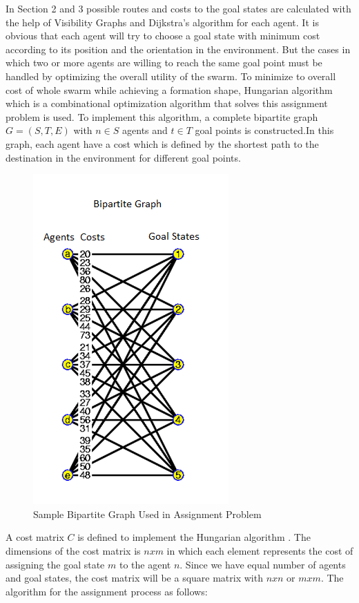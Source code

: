 \documentclass[twoside]{article}
\begin{document}
	
In Section 2 and 3 possible routes and costs to the goal states are calculated with the help of Visibility Graphs and Dijkstra's algorithm  for each agent. It is obvious that each agent will try to choose a goal state with minimum cost according to its position and the orientation in the environment. But the cases in which two or more agents are willing to reach the same goal point must be handled by optimizing the overall utility of the swarm. To minimize to overall cost of whole swarm while achieving a formation shape, Hungarian algorithm which is a combinational optimization algorithm that solves this assignment problem is used. To implement this algorithm, a complete bipartite graph $G=(S,T,E)$ with $n \in S$ agents and $t \in T$ goal points is constructed.In this graph, each agent have a cost which is defined by the shortest path to the destination in the environment for different goal points. 
	\begin{figure}[H]
		\includegraphics[width=.4\textwidth,center]{bipartite}
		\caption{Sample Bipartite Graph Used in Assignment Problem}
	\end{figure}

	A cost matrix  $C$ is defined to implement the Hungarian algorithm .  The dimensions of the cost matrix is $nxm$ in which each element represents the cost of assigning the goal state $m$ to the agent $n$.  Since we have equal number of agents and goal states, the cost matrix will be a square matrix with $nxn$ or $mxm$.  The algorithm for the assignment process as follows:
	
	
	
\end{document}

